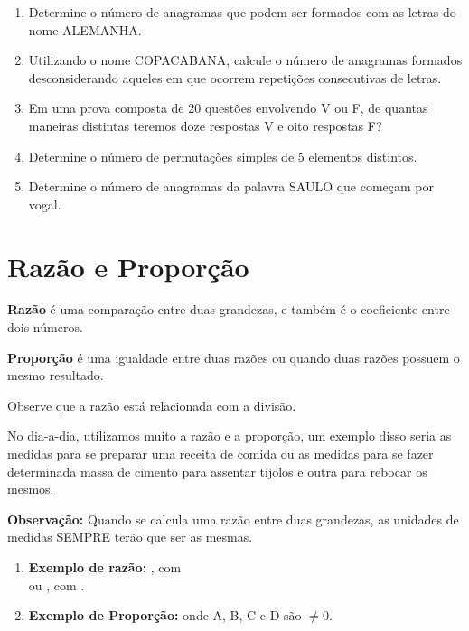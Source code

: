 \begin{multicols*}{2}
\begin{enumerate}
		\item Determine o número de anagramas que podem ser formados com as letras do nome ALEMANHA.

		\item Utilizando o nome COPACABANA, calcule o número de anagramas formados desconsiderando aqueles em que ocorrem repetições consecutivas de letras.

		\item Em uma prova composta de 20 questões envolvendo V ou F, de quantas maneiras distintas teremos doze respostas V e oito respostas F?

		\item Determine o número de permutações simples de 5 elementos distintos.

		\item Determine o número de anagramas da palavra SAULO que começam por vogal.

	\end{enumerate}

	\section{Razão e Proporção}

	\textbf{Razão} é uma comparação entre duas grandezas, e também é o coeficiente entre dois números.

	\textbf{Proporção} é uma igualdade entre duas razões ou quando duas razões possuem o mesmo resultado.

	Observe que a razão está relacionada com a divisão.

	No dia-a-dia, utilizamos muito a razão e a proporção, um exemplo disso seria as medidas para se preparar uma receita de comida ou as medidas para se fazer determinada massa de cimento para assentar tijolos e outra para rebocar os mesmos.

	\textbf{Observação:} Quando se calcula uma razão entre duas grandezas, as unidades de medidas SEMPRE terão que ser as mesmas.

	\begin{enumerate}

		\item \textbf{Exemplo de razão:}  , com\\

		      	 ou , com .

		\item \textbf{Exemplo de Proporção:} 	onde A, B, C e D são $\neq 0$.


\end{enumerate}
\end{multicols*}
